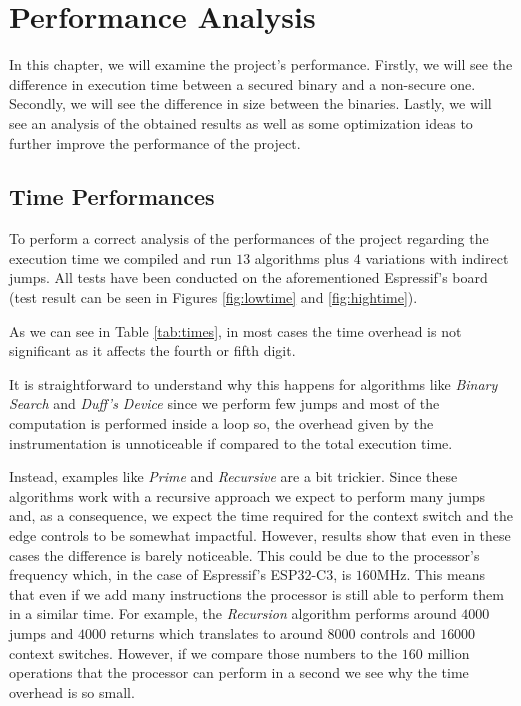 \chapter{Performance Analysis}
\label{cha:pa}

In this chapter, we will examine the project's performance. Firstly, we will see
the difference in execution time between a secured binary and a non-secure one.
Secondly, we will see the difference in size between the binaries. Lastly, we will
see an analysis of the obtained results as well as some optimization ideas to further
improve the performance of the project.

\section{Time Performances}
\label{sec:pa_time}

To perform a correct analysis of the performances of the project regarding the
execution time we compiled and run $13$ algorithms plus $4$ variations with
indirect jumps. All tests have been conducted on the aforementioned Espressif's board
(test result can be seen in Figures \ref{fig:lowtime} and \ref{fig:hightime}).

As we can see in Table \ref{tab:times}, in most cases the time overhead is not
significant as it affects the fourth or fifth digit.

It is straightforward to understand why this happens for algorithms like \textit{Binary
Search} and \textit{Duff's Device} since we perform few jumps and most of the
computation is performed inside a loop so, the overhead given by the instrumentation
is unnoticeable if compared to the total execution time.

Instead, examples like \textit{Prime} and \textit{Recursive} are a bit trickier.
Since these algorithms work with a recursive approach we expect to perform many jumps
and, as a consequence, we expect the time required for the context switch and the
edge controls to be somewhat impactful. However, results show that even in these
cases the difference is barely noticeable. This could be due to the processor's
frequency which, in the case of Espressif's ESP32-C3, is $160$MHz. This means
that even if we add many instructions the processor is still able to perform
them in a similar time. For example, the \textit{Recursion} algorithm performs around
$4000$ jumps and $4000$ returns which translates to around $8000$ controls and $1
6000$ context switches. However, if we compare those numbers to the $160$ million
operations that the processor can perform in a second we see why the time overhead
is so small.

